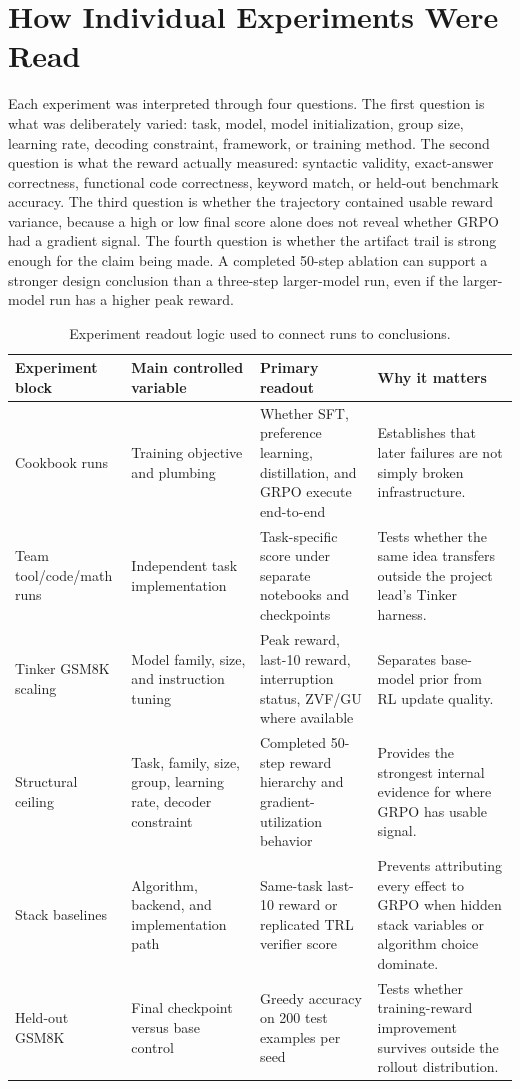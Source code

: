 \documentclass[12pt,a4paper]{report}
\begin{document}
\section{How Individual Experiments Were Read}
\label{sec:experiment-readout}

Each experiment was interpreted through four questions. The first question is what was deliberately varied: task, model, model initialization, group size, learning rate, decoding constraint, framework, or training method. The second question is what the reward actually measured: syntactic validity, exact-answer correctness, functional code correctness, keyword match, or held-out benchmark accuracy. The third question is whether the trajectory contained usable reward variance, because a high or low final score alone does not reveal whether GRPO had a gradient signal. The fourth question is whether the artifact trail is strong enough for the claim being made. A completed 50-step ablation can support a stronger design conclusion than a three-step larger-model run, even if the larger-model run has a higher peak reward.

\begin{table}[ht]
\centering
\caption{Experiment readout logic used to connect runs to conclusions.}
\label{tab:experiment-readout}
\footnotesize
\begin{tabularx}{\textwidth}{p{3.0cm}p{3.0cm}p{3.4cm}X}
\toprule
Experiment block & Main controlled variable & Primary readout & Why it matters\\
\midrule
Cookbook runs & Training objective and plumbing & Whether SFT, preference learning, distillation, and GRPO execute end-to-end & Establishes that later failures are not simply broken infrastructure.\\
Team tool/code/math runs & Independent task implementation & Task-specific score under separate notebooks and checkpoints & Tests whether the same idea transfers outside the project lead's Tinker harness.\\
Tinker GSM8K scaling & Model family, size, and instruction tuning & Peak reward, last-10 reward, interruption status, ZVF/GU where available & Separates base-model prior from RL update quality.\\
Structural ceiling & Task, family, size, group, learning rate, decoder constraint & Completed 50-step reward hierarchy and gradient-utilization behavior & Provides the strongest internal evidence for where GRPO has usable signal.\\
Stack baselines & Algorithm, backend, and implementation path & Same-task last-10 reward or replicated TRL verifier score & Prevents attributing every effect to GRPO when hidden stack variables or algorithm choice dominate.\\
Held-out GSM8K & Final checkpoint versus base control & Greedy accuracy on 200 test examples per seed & Tests whether training-reward improvement survives outside the rollout distribution.\\
\bottomrule
\end{tabularx}
\end{table}
\end{document}
